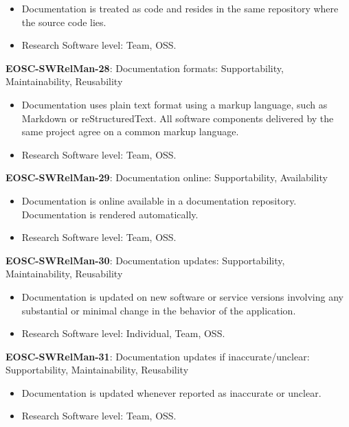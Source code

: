 \begin{itemize}
    \item Documentation is treated as code and resides in the same repository where the source code lies.~\cite{orviz_set_2017}
    \item Research Software level: Team, OSS.
\end{itemize}

\textbf{EOSC-SWRelMan-28}: Documentation formats: Supportability, Maintainability, Reusability

\begin{itemize}
    \item Documentation uses plain text format using a markup language, such as Markdown or reStructuredText. All software components delivered by the same project agree on a common markup language.~\cite{orviz_set_2017,raymond_software_2013}
    \item Research Software level: Team, OSS.
\end{itemize}

\textbf{EOSC-SWRelMan-29}: Documentation online: Supportability, Availability

\begin{itemize}
    \item Documentation is online available in a documentation repository. Documentation is rendered automatically.~\cite{orviz_set_2017,orviz_fernandez_eosc-synergy_2020}
    \item Research Software level: Team, OSS.
\end{itemize}

\textbf{EOSC-SWRelMan-30}: Documentation updates: Supportability, Maintainability, Reusability

\begin{itemize}
    \item Documentation is updated on new software or service versions involving any substantial or minimal change in the behavior of the application.~\cite{orviz_set_2017,orviz_fernandez_eosc-synergy_2020,raymond_software_2013}
    \item Research Software level: Individual, Team, OSS.
\end{itemize}

\textbf{EOSC-SWRelMan-31}: Documentation updates if inaccurate/unclear: Supportability, Maintainability, Reusability

\begin{itemize}
    \item Documentation is updated whenever reported as inaccurate or unclear.~\cite{orviz_set_2017,orviz_fernandez_eosc-synergy_2020}
    \item Research Software level: Team, OSS.
\end{itemize}

